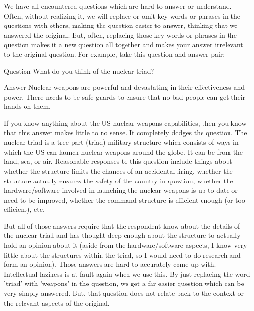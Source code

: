 We have all encountered questions which are hard to answer or understand. Often, without realizing it, we will replace or omit key words or phrases in the questions with others, making the question easier to answer, thinking that we answered the original.  But, often, replacing those key words or phrases in the question makes it a new question all together and makes your answer irrelevant to the original question. For example, take this question and answer pair:

\begin{earg}
\item[Question]What do you think of the nuclear triad? 
\item[Answer]Nuclear weapons are powerful and devastating in their effectiveness and power. There needs to be safe-guards to ensure that no bad people can get their hands on them.
\end{earg}

If you know anything about the US nuclear weapons capabilities, then you know that this answer makes little to no sense. It completely dodges the question. The nuclear triad is a tree-part (triad) military structure which consists of ways in which the US can launch nuclear weapons around the globe. It can be from the land, sea, or air. Reasonable responses to this question include things about whether the structure limits the chances of an accidental firing, whether the structure actually ensures the safety of the country in question, whether the hardware/software involved in launching the nuclear weapons is up-to-date or need to be improved, whether the command structure is efficient enough (or too efficient), etc.

But all of those answers require that the respondent know about the details of the nuclear triad and has thought deep enough about the structure to actually hold an opinion about it (aside from the hardware/software aspects, I know very little about the structures within the triad, so I would need to do research and form an opinion). Those answers are hard to accurately come up with. Intellectual laziness is at fault again when we use this. By just replacing the word 'triad' with 'weapons' in the question, we get a far easier question which can be very simply answered. But, that question does not relate back to the context or the relevant aspects of the original. 

